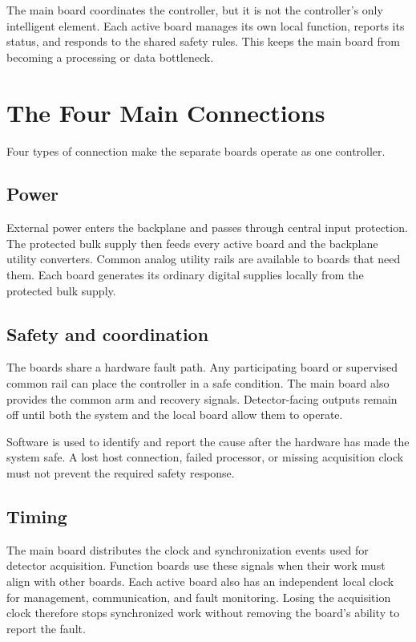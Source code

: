 The main board coordinates the controller, but it is not the controller's only intelligent element. Each active board manages its own local function, reports its status, and responds to the shared safety rules. This keeps the main board from becoming a processing or data bottleneck.

\section{The Four Main Connections}

Four types of connection make the separate boards operate as one controller.

\subsection{Power}

External power enters the backplane and passes through central input protection. The protected bulk supply then feeds every active board and the backplane utility converters. Common analog utility rails are available to boards that need them. Each board generates its ordinary digital supplies locally from the protected bulk supply.

\subsection{Safety and coordination}

The boards share a hardware fault path. Any participating board or supervised common rail can place the controller in a safe condition. The main board also provides the common arm and recovery signals. Detector-facing outputs remain off until both the system and the local board allow them to operate.

Software is used to identify and report the cause after the hardware has made the system safe. A lost host connection, failed processor, or missing acquisition clock must not prevent the required safety response.

\subsection{Timing}

The main board distributes the clock and synchronization events used for detector acquisition. Function boards use these signals when their work must align with other boards. Each active board also has an independent local clock for management, communication, and fault monitoring. Losing the acquisition clock therefore stops synchronized work without removing the board's ability to report the fault.

